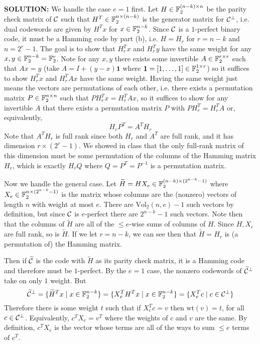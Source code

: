 \documentclass{article}
\newcommand{\Vol}{\mathrm{Vol}}
\begin{document}
\begin{enumerate}
\begin{enumerate}
\begin{shaded}
\textbf{SOLUTION:}
We handle the case $e = 1$ first. Let $H \in \mathbb{F}_2^{(n-k) \times n}$ be the parity check matrix of $\mathcal{C}$ such that $H^T \in \mathbb{F}_2^{n \times (n-k)}$ is the generator matrix for $\mathcal{C}^{\perp}$, i.e. dual codewords are given by $H^T x$ for $x \in \mathbb{F}_2^{n-k}$. Since $\mathcal{C}$ is a $1$-perfect binary code, it must be a Hamming code by part (b), i.e. $H = H_r$ for $r = n-k$ and $n = 2^r - 1$. The goal is to show that $H_r^T x$ and $H_r^T y$ have the same weight for any $x,y \in \mathbb{F}_2^{n-k} = \mathbb{F}_2^r$. Note for any $x,y$ there exists some invertible $A \in \mathbb{F}_2^{r \times r}$ such that $Ax = y$ (take $A = I + (y-x)\mathbf{1}$ where $\mathbf{1} = [1,\ldots,1] \in \mathbb{F}_2^{1\times r}$)
so it suffices to show $H_r^T x$ and $H_r^T A x$ have the same weight. Having the same weight just means the vectors are permutations of each other, i.e. there exists a permutation matrix $P \in \mathbb{F}_2^{n \times n}$ such that $P H_r^T x = H_r^T A x$, so it suffices to show for any invertible $A$ that there exists a permutation matrix $P$ with $P H_r^T = H_r^T A$ or, equivalently,
\[H_r P^T = A^T H_r\]
Note that $A^T H_r$ is full rank since both $H_r$ and $A^T$ are full rank, and it has dimension $r \times (2^r-1)$. We showed in class that the only full-rank matrix of this dimension must be some permutation of the columns of the Hamming matrix $H_r$, which is exactly $H_r Q$ where $Q = P^T = P^{-1}$ is a permutation matrix.

Now we handle the general case. Let $\widetilde{H} = H X_e \in \mathbb{F}_2^{(n-k) \times (2^{n-k}-1)}$ where $X_e \in \mathbb{F}_2^{n \times (2^{n-k}-1)}$ is the matrix whose columns are the (nonzero) vectors of length $n$ with weight at most $e$. There are $\Vol_2(n,e) - 1$ such vectors by definition, but since $\mathcal{C}$ is $e$-perfect there are $2^{n-k}-1$ such vectors. Note then that the columns of $\tilde{H}$ are all of the $\leq e$-wise sums of columns of $H$. Since $H, X_e$ are full rank, so is $\tilde{H}$. If we let $r = n - k$, we can see then that $\tilde{H} = H_r$ is (a permutation of) the Hamming matrix. 

Then if $\widetilde{\mathcal{C}}$ is the code with $\tilde{H}$ as its parity check matrix, it is a Hamming code and therefore must be $1$-perfect. By the $e = 1$ case, the nonzero codewords of $\widetilde{\mathcal{C}}^{\perp}$ take on only $1$ weight. But
\[\widetilde{\mathcal{C}}^{\perp} = \{\widetilde{H}^T x \mid x \in \mathbb{F}_2^{n-k}\} = \{X_e^T H^T x \mid x \in \mathbb{F}_2^{n-k}\} = \{X_e^T c \mid c \in \mathcal{C}^{\perp}\}\]
Therefore there is some weight $t$ such that if $X_e^T c = v$ then $\text{wt}(v) = t$, for all $c \in \mathcal{C}^{\perp}$. Equivalently, $c^T X_e = v^T$ where the weights of $c$ and $v$ are the same. By definition, $c^T X_e$ is the vector whose terms are all of the ways to sum $\leq e$ terms of $c^T$. 


\end{shaded}
\end{enumerate}
\end{enumerate}
\end{document}
